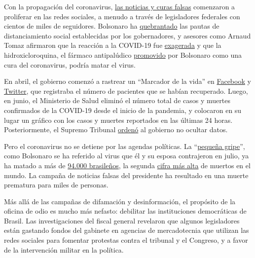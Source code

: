 Con la propagación del coronavirus,
\href{https://www.bbc.com/news/53361876}{las noticias y curas falsas}
comenzaron a proliferar en las redes sociales, a menudo a través de
legisladores federales con cientos de miles de seguidores. Bolsonaro ha
\href{https://www.hrw.org/news/2020/04/10/brazil-bolsonaro-sabotages-anti-covid-19-efforts}{quebrantado}
las pautas de distanciamiento social establecidas por los gobernadores,
y asesores como Arnaud Tomaz afirmaron que la reacción a la COVID-19 fue
\href{https://www.bbc.com/portuguese/brasil-53353594}{exagerada} y que
la hidroxicloroquina, el fármaco antipalúdico
\href{https://www.nytimes3xbfgragh.onion/2020/06/13/world/americas/virus-brazil-bolsonaro-chloroquine.html}{promovido}
por Bolsonaro como una cura del coronavirus, podría matar el virus.

En abril, el gobierno comenzó a rastrear un ``Marcador de la vida'' en
\href{https://www.facebookcorewwwi.onion/minsaude/posts/3549590468392877}{Facebook}
y
\href{https://twitter.com/secomvc/status/1257836970518200323}{Twitter},
que registraba el número de pacientes que se habían recuperado. Luego,
en junio, el Ministerio de Salud eliminó el número total de casos y
muertes confirmados de la COVID-19 desde el inicio de la pandemia, y
colocaron en su lugar un gráfico con los casos y muertes reportados en
las últimas 24 horas. Posteriormente, el Supremo Tribunal
\href{https://www.nytimes3xbfgragh.onion/2020/06/19/world/coronavirus-live-updates.html}{ordenó}
al gobierno no ocultar datos.

Pero el coronavirus no se detiene por las agendas políticas. La
``\href{https://www.cnn.com/2020/05/23/americas/brazil-coronavirus-hospitals-intl/index.html}{pequeña
gripe}'', como Bolsonaro se ha referido al virus que él y su esposa
contrajeron en julio, ya ha matado a más de
\href{https://www.nytimes3xbfgragh.onion/interactive/2020/world/americas/brazil-coronavirus-cases.html}{94.000
brasileños}, la segunda
\href{https://coronavirus.jhu.edu/map.html}{cifra más alta} de muertos
en el mundo. La campaña de noticias falsas del presidente ha resultado
en una muerte prematura para miles de personas.

Más allá de las campañas de difamación y desinformación, el propósito de
la oficina de odio es mucho más nefasto: debilitar las instituciones
democráticas de Brasil. Las investigaciones del fiscal general revelaron
que algunos legisladores están gastando fondos del gabinete en agencias
de mercadotecnia que utilizan las redes sociales para fomentar protestas
contra el tribunal y el Congreso, y a favor de la intervención militar
en la política.

